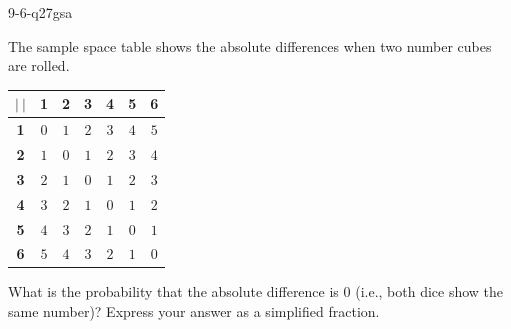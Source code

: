 \begin{practiceQuestion}{9-6-q27}{gsa}
\begin{questionText}
The sample space table shows the absolute differences when two number cubes are rolled.

\begin{center}
\begin{tabular}{c|cccccc}
$|\ |$ & \textbf{1} & \textbf{2} & \textbf{3} & \textbf{4} & \textbf{5} & \textbf{6} \\
\hline
\textbf{1} & $0$ & $1$ & $2$ & $3$ & $4$ & $5$ \\
\textbf{2} & $1$ & $0$ & $1$ & $2$ & $3$ & $4$ \\
\textbf{3} & $2$ & $1$ & $0$ & $1$ & $2$ & $3$ \\
\textbf{4} & $3$ & $2$ & $1$ & $0$ & $1$ & $2$ \\
\textbf{5} & $4$ & $3$ & $2$ & $1$ & $0$ & $1$ \\
\textbf{6} & $5$ & $4$ & $3$ & $2$ & $1$ & $0$ \\
\end{tabular}
\end{center}

What is the probability that the absolute difference is $0$ (i.e., both dice show the same number)? Express your answer as a simplified fraction.
\end{questionText}
\end{practiceQuestion}
